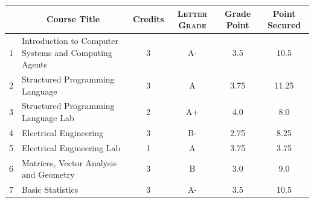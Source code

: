 \documentclass[11pt]{article}
\newcommand*{\numtwo}[1]{\pgfmathprintnumber[
                    fixed, precision=2, fixed zerofill=true]{#1}}
\begin{document}
                \begin{center}
                    \renewcommand{\arraystretch}{1.08}
                    
                \begin{tabular}{|c|l|c|>{\scshape}c|c|c|}
                \hline  \rule[-1ex]{0pt}{3.5ex} {\centering{\bf Course Code}} &  \multicolumn{1}{c|}{\textbf{Course Title}}  & {\bf Credits} & {\bf Letter Grade} & {\bf Grade Point} & {\bf Point Secured}  \\ 
                \hline   1 &  Introduction to Computer Systems and Computing Agents		 & 3 & A- & 3.5 & 10.5 \\ %
                \hline   2 &  Structured Programming Language		 & 3 & A & 3.75 & 11.25 \\ %
                \hline   3 &  Structured Programming Language Lab		 & 2 & A+ & 4.0 & 8.0 \\ %
                \hline   4 &  Electrical Engineering		 & 3 & B- & 2.75 & 8.25 \\ %
                \hline   5 &  Electrical Engineering Lab		 & 1 & A & 3.75 & 3.75 \\ %
                \hline   6 &  Matrices, Vector Analysis and Geometry		 & 3 & B & 3.0 & 9.0 \\ %
                \hline   7 &  Basic Statistics		 & 3 & A- & 3.5 & 10.5 \\ %

\hline                %
                \end{tabular}
                \end{center}
                \renewcommand{\arraystretch}{1.03}
\end{document}
